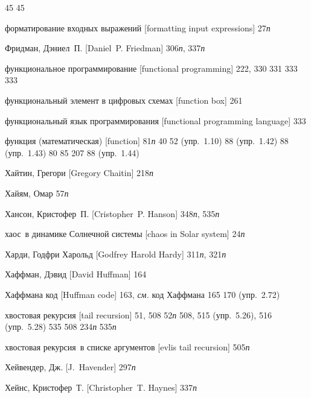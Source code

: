 \begin{theindex}
   45
   45
\item {форматирование входных выражений [formatting input expressions]} 27{\it п}
\item {Фридман, Дэниел~П. [Daniel~P. Friedman]} 306{\it п}, 337{\it п}
\item {функциональное программирование [functional programming]} 222, 330
   331
   333
   333
\item {функциональный элемент в цифровых схемах [function box]} 261
\item {функциональный язык программирования [functional programming language]} 333
\item {функция (математическая) [function]}
   81{\it п}
   40
   52 (упр.~1.10)
   88 (упр.~1.42)
   88 (упр.~1.43)
   80
   85
   207
   88 (упр.~1.44)
\bigskip
\item {Хайтин, Грегори [Gregory Chaitin]} 218{\it п}
\item {Хайям, Омар} 57{\it п}
\item {Хансон, Кристофер~П. [Cristopher~P. Hanson]} 348{\it п}, 535{\it п}
\item {хаос~в динамике Солнечной системы [chaos in Solar system]} 24{\it п}
\item {Харди, Годфри Харольд [Godfrey Harold Hardy]} 311{\it п}, 321{\it п}
\item {Хаффман, Дэвид [David Huffman]} 164
\item {Хаффмана код [Huffman code]} 163, {\it см.} код Хаффмана
   165
   170 (упр.~2.72)
\item {хвостовая рекурсия [tail recursion]} 51, 508
   52{\it п}
   508, 515 (упр.~5.26), 516 (упр.~5.28)
   535
   508
   234{\it п}
   535{\it п}
\item {хвостовая рекурсия~в списке аргументов [evlis tail recursion]} 505{\it п}
\item {Хейвендер, Дж. [J.~Havender]} 297{\it п}
\item {Хейнс, Кристофер~Т. [Christopher~T. Haynes]} 337{\it п}

\end{theindex}
